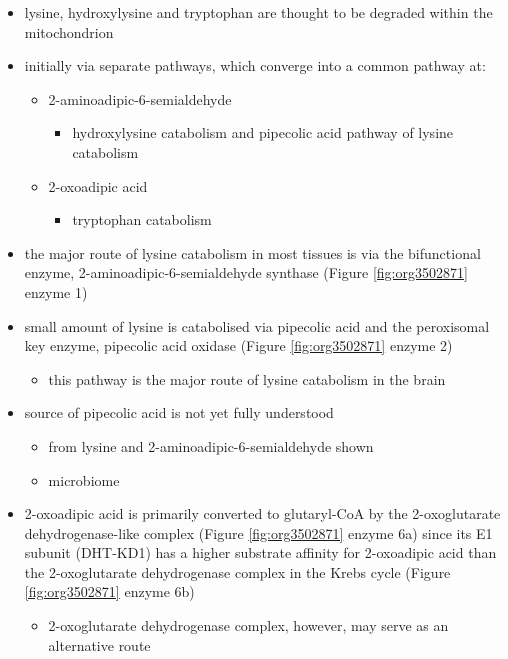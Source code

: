 \documentclass{scrartcl}
\begin{document}
\begin{itemize}
\item lysine, hydroxylysine and tryptophan are thought to be degraded
within the mitochondrion
\item initially via separate pathways, which converge into a common 
pathway at:
\begin{itemize}
\item 2-aminoadipic-6-semialdehyde
\begin{itemize}
\item hydroxylysine catabolism and pipecolic acid pathway of lysine
catabolism
\end{itemize}
\item 2-oxoadipic acid
\begin{itemize}
\item tryptophan catabolism
\end{itemize}
\end{itemize}
\item the major route of lysine catabolism in most tissues is via the
bifunctional enzyme, 2-aminoadipic-6-semialdehyde synthase (Figure \ref{fig:org3502871} enzyme 1)
\item small amount of lysine is catabolised via pipecolic acid and the
peroxisomal key enzyme, pipecolic acid oxidase (Figure \ref{fig:org3502871} enzyme 2)
\begin{itemize}
\item this pathway is the major route of lysine catabolism in the
brain
\end{itemize}
\item source of pipecolic acid is not yet fully understood
\begin{itemize}
\item from lysine and 2-aminoadipic-6-semialdehyde shown
\item microbiome
\end{itemize}

\item 2-oxoadipic acid is primarily converted to glutaryl-CoA by the
2-oxoglutarate dehydrogenase-like complex (Figure \ref{fig:org3502871} enzyme 6a)
since its E1 subunit (DHT-KD1) has a higher substrate affinity for
2-oxoadipic acid than the 2-oxoglutarate dehydrogenase complex in
the Krebs cycle (Figure \ref{fig:org3502871} enzyme 6b)

\begin{itemize}
\item 2-oxoglutarate dehydrogenase complex, however, may serve as an
alternative route


\end{itemize}
\end{itemize}
\end{document}
